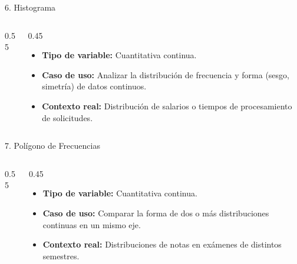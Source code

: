 \documentclass[aspectratio=169,10pt]{beamer}
\begin{document}
\begin{frame}{6. Histograma}
\begin{columns}
\begin{column}{0.55\textwidth}
\end{column}
\begin{column}{0.45\textwidth}
\begin{itemize}\small
\item \textbf{Tipo de variable:} Cuantitativa continua.
\item \textbf{Caso de uso:} Analizar la distribución de frecuencia y forma (sesgo, simetría) de datos continuos.
\item \textbf{Contexto real:} Distribución de salarios o tiempos de procesamiento de solicitudes.
\end{itemize}
\end{column}
\end{columns}
\end{frame}

\begin{frame}{7. Polígono de Frecuencias}
\begin{columns}
\begin{column}{0.55\textwidth}
\end{column}
\begin{column}{0.45\textwidth}
\begin{itemize}\small
\item \textbf{Tipo de variable:} Cuantitativa continua.
\item \textbf{Caso de uso:} Comparar la forma de dos o más distribuciones continuas en un mismo eje.
\item \textbf{Contexto real:} Distribuciones de notas en exámenes de distintos semestres.
\end{itemize}
\end{column}
\end{columns}
\end{frame}
\end{document}
